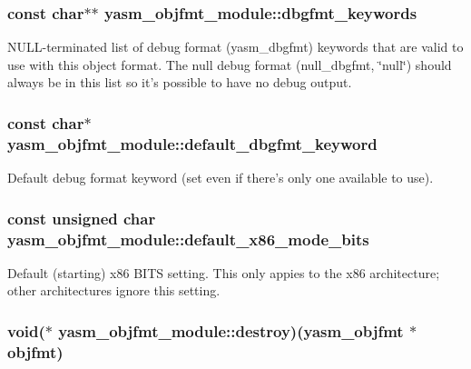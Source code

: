 \hypertarget{structyasm__objfmt__module_a1e349c3c4f8a09df4d45c41722065db7}{
\subsubsection[{dbgfmt\-\_\-keywords}]{\setlength{\rightskip}{0pt plus 5cm}const char$\ast$$\ast$ yasm\-\_\-objfmt\-\_\-module\-::dbgfmt\-\_\-keywords}}\label{structyasm__objfmt__module_a1e349c3c4f8a09df4d45c41722065db7}
N\-U\-L\-L-\/terminated list of debug format (yasm\-\_\-dbgfmt) keywords that are valid to use with this object format. The null debug format (null\-\_\-dbgfmt, \char`\"{}null\char`\"{}) should always be in this list so it's possible to have no debug output. \hypertarget{structyasm__objfmt__module_a922fb0423c14cd77aa56609224f3989c}{
\subsubsection[{default\-\_\-dbgfmt\-\_\-keyword}]{\setlength{\rightskip}{0pt plus 5cm}const char$\ast$ yasm\-\_\-objfmt\-\_\-module\-::default\-\_\-dbgfmt\-\_\-keyword}}\label{structyasm__objfmt__module_a922fb0423c14cd77aa56609224f3989c}
Default debug format keyword (set even if there's only one available to use). \hypertarget{structyasm__objfmt__module_a3e301d11243b9378f5aedc4c92efba7c}{
\subsubsection[{default\-\_\-x86\-\_\-mode\-\_\-bits}]{\setlength{\rightskip}{0pt plus 5cm}const unsigned char yasm\-\_\-objfmt\-\_\-module\-::default\-\_\-x86\-\_\-mode\-\_\-bits}}\label{structyasm__objfmt__module_a3e301d11243b9378f5aedc4c92efba7c}
Default (starting) x86 B\-I\-T\-S setting. This only appies to the x86 architecture; other architectures ignore this setting. \hypertarget{structyasm__objfmt__module_a05410dbea47334da2d93813be396c109}{
\subsubsection[{destroy}]{\setlength{\rightskip}{0pt plus 5cm}void($\ast$ yasm\-\_\-objfmt\-\_\-module\-::destroy)({\bf yasm\-\_\-objfmt} $\ast$objfmt)}}\label{structyasm__objfmt__module_a05410dbea47334da2d93813be396c109}
